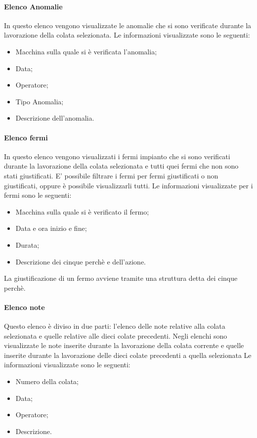   \paragraph{Elenco Anomalie}
  In questo elenco vengono visualizzate le anomalie che si sono verificate durante la lavorazione della colata 
  selezionata. Le informazioni visualizzate sono le seguenti:
  \begin{itemize}
    \item Macchina sulla quale si è verificata l'anomalia;
    \item Data;
    \item Operatore;
    \item Tipo Anomalia;
    \item Descrizione dell'anomalia.
  \end{itemize} 
  
  
  \paragraph{Elenco fermi}
  In questo elenco vengono visualizzati i fermi impianto che si sono verificati durante la lavorazione della colata selezionata e 
  tutti quei fermi che non sono stati giustificati. E' possibile filtrare i fermi per fermi giustificati 
  o non giustificati, oppure è possibile visualizzarli tutti. Le informazioni visualizzate per i fermi 
  sono le seguenti:
  \begin{itemize}
    \item Macchina sulla quale si è verificato il fermo;
    \item Data e ora inizio e fine;
    \item Durata;
    \item Descrizione dei cinque perchè e dell’azione.
  \end{itemize}
  La giustificazione di un fermo avviene tramite una struttura detta dei cinque perchè.
    
  \paragraph{Elenco note}
  Questo elenco è diviso in due parti: l'elenco delle note relative alla colata selezionata e quelle relative alle 
  dieci colate precedenti. Negli elenchi sono visualizzate le note inserite durante la lavorazione della colata corrente 
  e quelle inserite durante la lavorazione delle dieci colate precedenti a quella selezionata 
  Le informazioni visualizzate sono le seguenti:
  \begin{itemize}
    \item Numero della colata;
    \item Data;
    \item Operatore;
    \item Descrizione.
  \end{itemize}   

